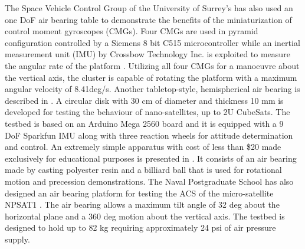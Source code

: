 \documentclass[aerospace,article,submit,moreauthors,dvi2pdf]{Definitions/mdpi}
\begin{document}
The Space Vehicle Control Group of the University of Surrey's has also used an one DoF air bearing table to demonstrate the benefits of the miniaturization of control moment gyroscopes (CMGs). Four CMGs are used in pyramid configuration controlled by a Siemens 8 bit C515 microcontroller while an inertial measurement unit (IMU) by Crossbow Technology Inc. is exploited to measure the angular rate of the platform \cite{lappasthesis}. Utilizing all four CMGs for a manoeuvre about the vertical axis, the cluster is capable of rotating the platform with a maximum angular velocity of 8.41deg/s.
Another tabletop-style, hemispherical air bearing is described in \cite{7}. A circular disk with 30 cm of diameter and thickness 10 mm is developed for testing the behaviour of nano-satellites, up to 2U CubeSats. The testbed is based on an Arduino Mega 2560 board and it is equipped with a 9 DoF Sparkfun IMU along with three reaction wheels for attitude determination and control.
An extremely simple apparatus with cost of less than \$20 made exclusively for educational purposes is presented in \cite{12}. It consists of an air bearing made by casting polyester resin and a billiard ball that is used for rotational motion and precession demonstrations.
The Naval Postgraduate School has also designed an air bearing platform for testing the ACS of the micro-satellite NPSAT1 \cite{3}.  The air bearing allows a maximum tilt angle of 32 deg about the horizontal plane and a 360 deg motion about the vertical axis. The testbed is designed to hold up to 82 kg requiring approximately 24 psi of air pressure supply.
\end{document}

